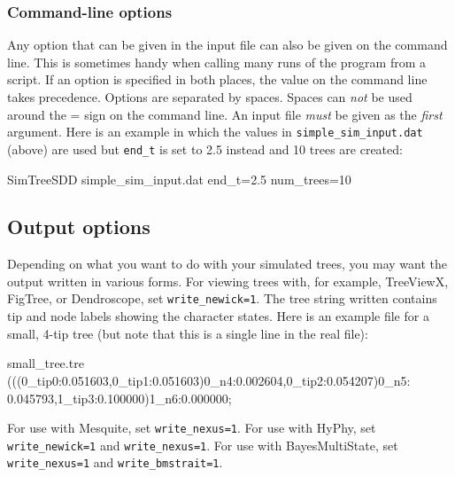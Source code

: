 \documentclass[10pt]{article}
\begin{document}
\subsubsection*{Command-line options}

Any option that can be given in the input file can also be given on the command line.  This is sometimes handy when calling many runs of the program from a script.
If an option is specified in both places, the value on the command line takes precedence.  Options are separated by spaces.  Spaces can {\em not} be used around the = sign on the command line.  An input file {\em must} be given as the {\em first} argument.  Here is an example in which the values in \texttt{simple\_sim\_input.dat} (above) are used but \texttt{end\_t} is set to 2.5 instead and 10 trees are created:
\begin{commandis}
	SimTreeSDD simple\_sim\_input.dat end\_t=2.5 num\_trees=10
\end{commandis}


\subsection*{Output options}

Depending on what you want to do with your simulated trees, you may want the output written in various forms.  
For viewing trees with, for example, TreeViewX, FigTree, or Dendroscope, set \texttt{write\_newick=1}.
The tree string written contains tip and node labels showing the character states.  Here is an example file for a small, 4-tip tree (but note that this is a single line in the real file):
\begin{filesays}{small\_tree.tre}
(((0\_tip0:0.051603,0\_tip1:0.051603)0\_n4:0.002604,0\_tip2:0.054207)0\_n5:\\0.045793,1\_tip3:0.100000)1\_n6:0.000000;
\end{filesays}

For use with Mesquite, set \texttt{write\_nexus=1}.
For use with HyPhy, set \texttt{write\_newick=1} and \texttt{write\_nexus=1}.
For use with BayesMultiState, set \texttt{write\_nexus=1} and \texttt{write\_bmstrait=1}.
\end{document}
